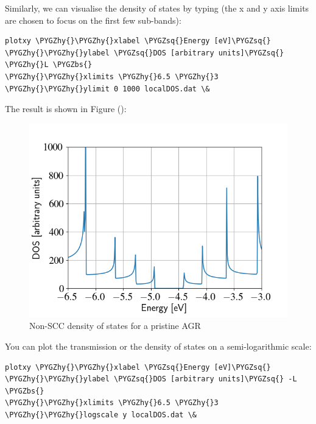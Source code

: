 \documentclass[a4paper,11pt,english]{sphinxmanual}
\def\PYGZbs{\char`\\}
\def\PYGZhy{\char`\-}
\def\PYGZsq{\char`\'}
\renewcommand\PYGZsq{\textquotesingle}
\begin{document}
{{Similarly, we can visualise the density of states by typing (the x and
y axis limits are chosen to focus on the first few sub-bands):

\begin{Verbatim}[commandchars=\\\{\}]
plotxy \PYGZhy{}\PYGZhy{}xlabel \PYGZsq{}Energy [eV]\PYGZsq{} \PYGZhy{}\PYGZhy{}ylabel \PYGZsq{}DOS [arbitrary units]\PYGZsq{} \PYGZhy{}L \PYGZbs{}
\PYGZhy{}\PYGZhy{}xlimits \PYGZhy{}6.5 \PYGZhy{}3 \PYGZhy{}\PYGZhy{}ylimit 0 1000 localDOS.dat \&
\end{Verbatim}

The result is shown in Figure {\hyperref[transport:fig-nonscc-dos]{\emph{}}} ():
\begin{figure}[htbp]
\centering
\capstart
\includegraphics[width=0.700\linewidth]{nonscc-dos.png}
\caption{Non-SCC density of states for a pristine AGR}\label{transport:fig-nonscc-dos}\end{figure}

You can plot the transmission or the density of states on a
semi-logarithmic scale:

\begin{Verbatim}[commandchars=\\\{\}]
plotxy \PYGZhy{}\PYGZhy{}xlabel \PYGZsq{}Energy [eV]\PYGZsq{} \PYGZhy{}\PYGZhy{}ylabel \PYGZsq{}DOS [arbitrary units]\PYGZsq{} -L \PYGZbs{}
\PYGZhy{}\PYGZhy{}xlimits \PYGZhy{}6.5 \PYGZhy{}3 \PYGZhy{}\PYGZhy{}logscale y localDOS.dat \&
\end{Verbatim}

}}
\end{document}
